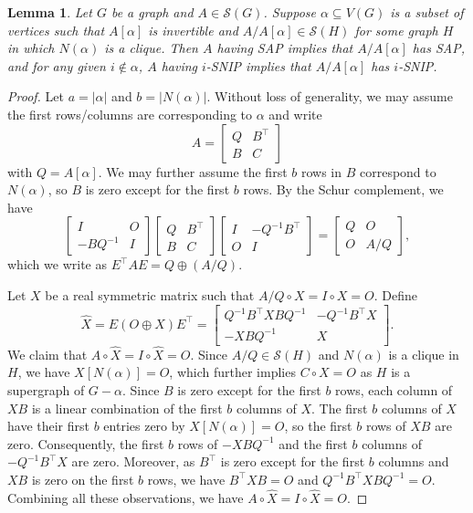 \documentclass{article}
\newtheorem{lemma}[theorem]{Lemma}
\theoremstyle{definition}
\newcommand{\trans}{^\top}
\newcommand{\mptn}{\mathcal{S}} %
\begin{document}
\begin{lemma}
\label{lem:schursnip}
Let $G$ be a graph and $A\in\mptn(G)$.  Suppose $\alpha\subseteq V(G)$ is a subset of vertices such that $A[\alpha]$ is invertible and $A/A[\alpha]\in\mptn(H)$ for some graph $H$ in which $N(\alpha)$ is a clique.  Then $A$ having SAP implies that $A/A[\alpha]$ has SAP, and for any given $i\notin\alpha$, $A$ having $i$-SNIP implies that $A/A[\alpha]$ has $i$-SNIP.  
\end{lemma}
\begin{proof}
Let $a = |\alpha|$ and $b = |N(\alpha)|$.  Without loss of generality, we may assume the first rows/columns are corresponding to $\alpha$ and write 
\[
    A = 
        \begin{bmatrix}
        Q & B\trans \\
        B & C
    \end{bmatrix}
\]
with $Q = A[\alpha]$.  We may further assume the first $b$ rows in $B$ correspond to $N(\alpha)$, so $B$ is zero except for the first $b$ rows.  By the Schur complement, we have 
\[
    \begin{bmatrix}
        I & O \\
        -BQ^{-1} & I
    \end{bmatrix}
    \begin{bmatrix}
        Q & B\trans \\
        B & C
    \end{bmatrix}
    \begin{bmatrix}
        I & -Q^{-1}B\trans \\
        O & I
    \end{bmatrix} = 
    \begin{bmatrix}
    Q & O \\
    O & A / Q
    \end{bmatrix},
\]
which we write as $E\trans A E = Q\oplus (A/Q)$.

Let $X$ be a real symmetric matrix such that $A/Q\circ X = I\circ X = O$.  Define  
\[
    \widehat{X} = E(O\oplus X)E\trans = 
    \begin{bmatrix}
        Q^{-1}B\trans XBQ^{-1} & -Q^{-1}B\trans X\\
        -XBQ^{-1} & X
    \end{bmatrix}.
\]
We claim that $A\circ\widehat{X} = I\circ\widehat{X} = O$.  
Since $A/Q\in\mptn(H)$ and $N(\alpha)$ is a clique in $H$, we have $X[N(\alpha)] = O$, which further implies $C\circ X = O$ as $H$ is a supergraph of $G - \alpha$.  
Since $B$ is zero except for the first $b$ rows, each column of $XB$ is a linear combination of the first $b$ columns of $X$.  The first $b$ columns of $X$ have their first $b$ entries zero by $X[N(\alpha)] = O$, so the first $b$ rows of $XB$ are zero.  Consequently, the first $b$ rows of $-XBQ^{-1}$ and the first $b$ columns of $-Q^{-1}B\trans X$ are zero.  Moreover, as $B\trans$ is zero except for the first $b$ columns and $XB$ is zero on the first $b$ rows, we have $B\trans XB = O$ and $Q^{-1}B\trans XBQ^{-1} = O$.  Combining all these observations, we have $A\circ\widehat{X} = I\circ\widehat{X} = O$.  


\end{proof}
\end{document}
